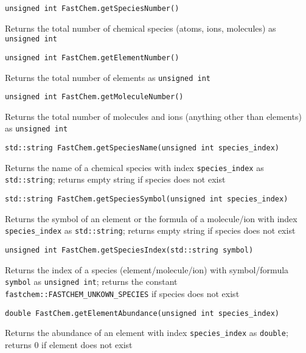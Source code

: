 \documentclass[numbers=noenddot]{aux/fcmanual}
\begin{document}
\bigbreak

\lstinline!unsigned int FastChem.getSpeciesNumber()!
  \begin{addmargin}[25pt]{0pt}
    Returns the total number of chemical species (atoms, ions, molecules) as \lstinline!unsigned int!
  \end{addmargin}
  
\bigbreak

\lstinline!unsigned int FastChem.getElementNumber()!
\begin{addmargin}[25pt]{0pt}
  Returns the total number of elements as \lstinline!unsigned int!
\end{addmargin}

\bigbreak

\lstinline!unsigned int FastChem.getMoleculeNumber()!
\begin{addmargin}[25pt]{0pt}
  Returns the total number of molecules and ions (anything other than elements) as \lstinline!unsigned int!
\end{addmargin}

\bigbreak

\lstinline!std::string FastChem.getSpeciesName(unsigned int species_index)!
\begin{addmargin}[25pt]{0pt}
  Returns the name of a chemical species with index \lstinline!species_index! as \lstinline!std::string!; returns empty string if species does not exist
\end{addmargin}  

\bigbreak

\lstinline!std::string FastChem.getSpeciesSymbol(unsigned int species_index)!
\begin{addmargin}[25pt]{0pt}
  Returns the symbol of an element or the formula of a molecule/ion with index \lstinline!species_index! as \lstinline!std::string!; returns empty string if species does not exist
\end{addmargin}

\bigbreak

\lstinline!unsigned int FastChem.getSpeciesIndex(std::string symbol)!
\begin{addmargin}[25pt]{0pt}
  Returns the index of a species (element/molecule/ion) with symbol/formula \lstinline!symbol! as \lstinline!unsigned int!; returns the constant \lstinline!fastchem::FASTCHEM_UNKOWN_SPECIES! if species does not exist
\end{addmargin}

\bigbreak

\lstinline!double FastChem.getElementAbundance(unsigned int species_index)!
\begin{addmargin}[25pt]{0pt}
  Returns the abundance of an element with index \lstinline!species_index! as \lstinline!double!; returns 0 if element does not exist
\end{addmargin}
\end{document}
